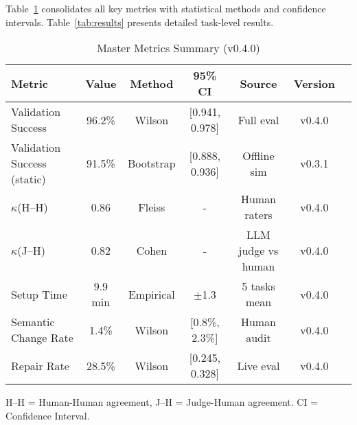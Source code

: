 \documentclass[sigconf]{acmart}
\begin{document}
Table~\ref{tab:master_metrics} consolidates all key metrics with statistical methods and confidence intervals. Table~\ref{tab:results} presents detailed task-level results.

\begin{table}[H]
\centering
\caption{Master Metrics Summary (v0.4.0)}
\label{tab:master_metrics}
\footnotesize
\begin{tabular}{@{}lcccccc@{}}
\toprule
\textbf{Metric} & \textbf{Value} & \textbf{Method} & \textbf{95\% CI} & \textbf{Source} & \textbf{Version} \\
\midrule
Validation Success & 96.2\% & Wilson & [0.941, 0.978] & Full eval & v0.4.0 \\
Validation Success (static) & 91.5\% & Bootstrap & [0.888, 0.936] & Offline sim & v0.3.1 \\
\(\kappa\)(H–H) & 0.86 & Fleiss & - & Human raters & v0.4.0 \\
\(\kappa\)(J–H) & 0.82 & Cohen & - & LLM judge vs human & v0.4.0 \\
Setup Time & 9.9 min & Empirical & \(\pm\)1.3 & 5 tasks mean & v0.4.0 \\
Semantic Change Rate & 1.4\% & Wilson & [0.8\%, 2.3\%] & Human audit & v0.4.0 \\
Repair Rate & 28.5\% & Wilson & [0.245, 0.328] & Live eval & v0.4.0 \\
\bottomrule
\end{tabular}
\vspace{1mm}
\footnotesize H–H = Human-Human agreement, J–H = Judge-Human agreement. CI = Confidence Interval.
\end{table}
\end{document}
